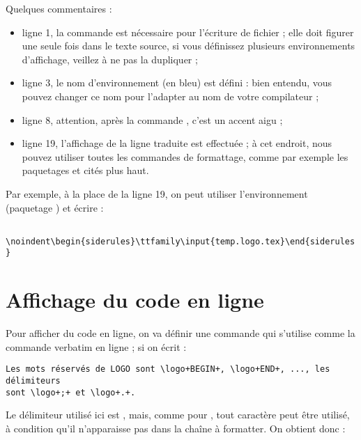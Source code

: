 Quelques commentaires :
\begin{itemize}
  \item ligne 1, la commande  est nécessaire pour l'écriture de fichier ; elle doit figurer une seule fois dans le texte source, si vous définissez plusieurs environnements d'affichage, veillez à ne pas la dupliquer ; 
  \item ligne 3, le nom d'environnement (en bleu) est défini : bien entendu, vous pouvez changer ce nom pour l'adapter au nom de votre compilateur ;
  \item ligne 8, attention, après la commande , c'est un accent aigu \tpp{\`{}} ;
  \item ligne 19, l'affichage de la ligne traduite est effectuée ; à cet endroit, nous pouvez utiliser toutes les commandes de formattage, comme par exemple les paquetages  et  cités plus haut.
\end{itemize}

Par exemple, à la place de la ligne 19, on peut utiliser l'environnement  (paquetage ) et écrire :

\texttt{
\textbackslash noindent\textbackslash begin\{siderules\}\textbackslash ttfamily\textbackslash input\{temp.logo.tex\}\textbackslash end\{siderules\}
}












\section{Affichage du code en ligne}

Pour afficher du code en ligne, on va définir une commande  qui s'utilise comme la commande verbatim en ligne  ; si on écrit :

\begin{verbatim}
Les mots réservés de LOGO sont \logo+BEGIN+, \logo+END+, ..., les délimiteurs
sont \logo+;+ et \logo+.+.
\end{verbatim}

Le délimiteur utilisé ici est \tpp{+}, mais, comme pour , tout caractère peut être utilisé, à condition qu'il n'apparaisse pas dans la chaîne à formatter. On obtient donc :

